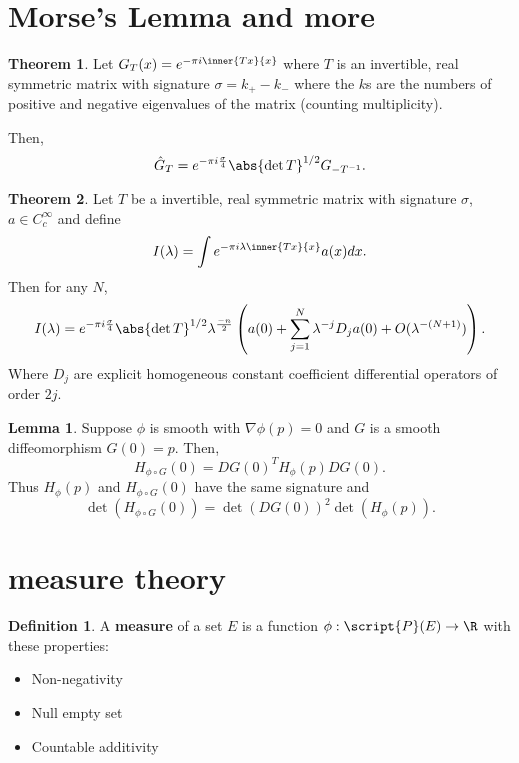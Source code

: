 \documentclass[a5paper]{article}
\theoremstyle{definition}%
\newtheorem*{theorem*}{Theorem} %
\newtheorem{lemma}[theorem]{Lemma}
\newtheorem*{definition*}{Definition}
\numberwithin{exercise}{section}
\theoremstyle{remark}%
\begin{document}


\section*{Morse's Lemma and more}

\begin{theorem*} Let $G_T(x)=e^{-\pi i \inner{Tx}{x}}$ where $T$ is an invertible, real symmetric matrix with signature $\sigma=k_+-k_-$ where the $k$s are the numbers of positive and negative eigenvalues of the matrix (counting multiplicity). 

Then, 
$$\hat{G}_T=e^{-\pi i \frac{\sigma}{4}}\abs{\det T}^{1/2}G_{-T^{-1}}.$$

\end{theorem*}

\begin{theorem*}
Let $T$ be a invertible, real symmetric matrix with signature $\sigma$, $a\in C^\infty_c$ and define 
$$I(\lambda)= \int e^{-\pi i \lambda \inner{Tx}{x}} a(x) dx.$$
Then for any $N$, 
$$I(\lambda)= e^{-\pi i \frac{\sigma}{4}} \abs{\det T}^{1/2} \lambda^\frac{-n}{2} \left(a(0)+\sum_{j=1}^N \lambda^{-j}D_ja(0)+O(\lambda^{-(N+1)})\right).$$
Where $D_j$ are explicit homogeneous constant coefficient differential operators of order $2j$. 
\end{theorem*}

\begin{lemma}
Suppose $\phi$ is smooth with $\nabla \phi(p)=0$ and $G$ is a smooth diffeomorphism $G(0)=p$. Then, 
$$H_{\phi\circ G}(0)=DG(0)^TH_\phi(p)DG(0).$$
Thus $H_\phi(p)$ and $H_{\phi\circ G}(0)$ have the same signature and 
$$\det(H_{\phi\circ G}(0))=\det(DG(0))^2\det(H_\phi(p)).$$
\end{lemma}


\pagebreak
\section{measure theory}
\begin{highlight}
\begin{definition*}
A \textbf{measure} of a set $E$ is a function $\phi:\script{P}(E)\to\R$ with these properties:
\begin{itemize}
	\item Non-negativity
	\item Null empty set
	\item Countable additivity
\end{itemize}
\end{definition*}
\end{highlight}
\end{document}
